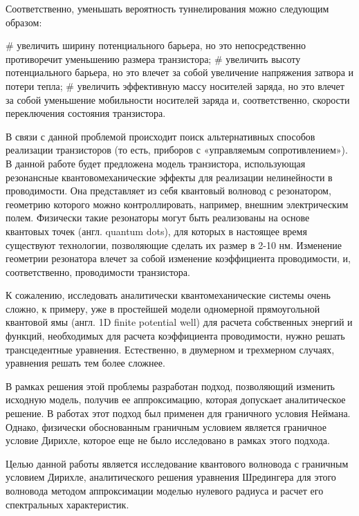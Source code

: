 Соответственно, уменьшать вероятность туннелирования можно следующим образом:

\begin{easylist}[itemize]
# увеличить ширину потенциального барьера, но это непосредственно противоречит уменьшению размера транзистора;
# увеличить высоту потенциального барьера, но это влечет за собой увеличение напряжения затвора и потери тепла;
# увеличить эффективную массу носителей заряда, но это влечет за собой уменьшение мобильности носителей заряда и, соответственно, скорости переключения состояния транзистора.
\end{easylist}

В связи с данной проблемой происходит поиск альтернативных способов реализации транзисторов (то есть, приборов с «управляемым сопротивлением»). В данной работе будет предложена модель транзистора, использующая резонансные квантовомеханические эффекты для реализации нелинейности в проводимости. Она представляет из себя квантовый волновод с резонатором, геометрию которого можно контроллировать, например, внешним электрическим полем. Физически такие резонаторы могут быть реализованы на основе квантовых точек (англ. quantum dots), для которых в настоящее время существуют технологии, позволяющие сделать их размер в 2-10 нм. Изменение геометрии резонатора влечет за собой изменение коэффициента проводимости, и, соответственно, проводимости транзистора.

К сожалению, исследовать аналитически квантомеханические системы очень сложно, к примеру, уже в простейшей модели одномерной прямоугольной квантовой ямы (англ. 1D finite potential well) для расчета собственных энергий и функций, необходимых для расчета коэффициента проводимости, нужно решать трансцедентные уравнения. Естественно, в двумерном и трехмерном случаях, уравнения решать тем более сложнее.

В рамках решения этой проблемы разработан подход, позволяющий изменить исходную модель, получив ее аппроксимацию, которая допускает аналитическое решение. В работах \cite{popov1992extension, popov1992resonator, popov1993zero} этот подход был применен для граничного условия Неймана. Однако, физически обоснованным граничным условием является граничное условие Дирихле, которое еще не было исследовано в рамках этого подхода.

Целью данной работы является исследование квантового волновода с граничным условием Дирихле, аналитического решения уравнения Шредингера для этого волновода методом аппроксимации моделью нулевого радиуса и расчет его спектральных характеристик.